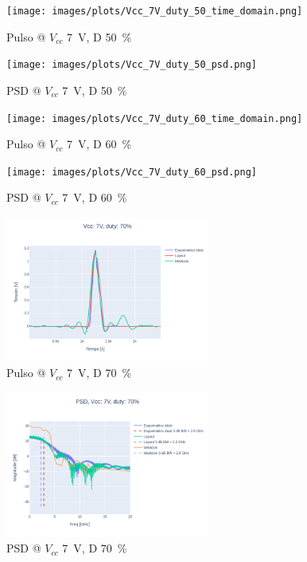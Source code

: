 \begin{figure}
  \centering
    \texttt{[image: images/plots/Vcc\_7V\_duty\_50\_time\_domain.png]}
    \caption{Pulso @ $V_{cc}$ \qty{7}{\volt}, D \qty{50}{\percent} }
    \label{fig:plots_7v_50}
\end{figure}

\begin{figure}
  \centering
    \texttt{[image: images/plots/Vcc\_7V\_duty\_50\_psd.png]}
    \caption{PSD @ $V_{cc}$ \qty{7}{\volt}, D \qty{50}{\percent} }
    \label{fig:psd_7v_50}
\end{figure}

\begin{figure}
  \centering
    \texttt{[image: images/plots/Vcc\_7V\_duty\_60\_time\_domain.png]}
    \caption{Pulso @ $V_{cc}$ \qty{7}{\volt}, D \qty{60}{\percent} }
    \label{fig:plots_7v_60}
\end{figure}

\begin{figure}
  \centering
    \texttt{[image: images/plots/Vcc\_7V\_duty\_60\_psd.png]}
    \caption{PSD @ $V_{cc}$ \qty{7}{\volt}, D \qty{60}{\percent} }
    \label{fig:psd_7v_60}
\end{figure}

\begin{figure}
  \centering
    \includegraphics[width=0.6\textwidth]{images/plots/Vcc_7V_duty_70_time_domain.png}
    \caption{Pulso @ $V_{cc}$ \qty{7}{\volt}, D \qty{70}{\percent} }
    \label{fig:plots_7v_70}
\end{figure}

\begin{figure}
  \centering
    \includegraphics[width=0.6\textwidth]{images/plots/Vcc_7V_duty_70_psd.png}
    \caption{PSD @ $V_{cc}$ \qty{7}{\volt}, D \qty{70}{\percent} }
    \label{fig:psd_7v_70}
\end{figure}

